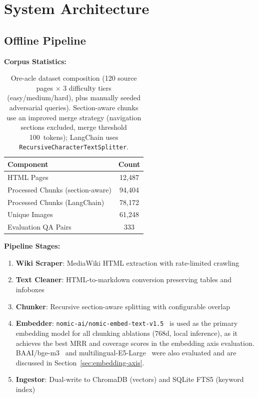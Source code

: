 \documentclass[11pt,a4paper]{article}
\begin{document}
\section{System Architecture}

\subsection{Offline Pipeline}

\textbf{Corpus Statistics:}
\begin{table}[h]
\caption{Ore-acle dataset composition (120 source pages $\times$ 3 difficulty tiers (easy/medium/hard), plus manually seeded adversarial queries). Section-aware chunks use an improved merge strategy (navigation sections excluded, merge threshold 100~tokens); LangChain uses \texttt{RecursiveCharacterTextSplitter}.}
\centering
\begin{tabular}{lc}
\toprule
\textbf{Component} & \textbf{Count} \\
\midrule
HTML Pages & 12,487 \\
Processed Chunks (section-aware) & 94,404 \\
Processed Chunks (LangChain) & 78,172 \\
Unique Images & 61,248 \\
Evaluation QA Pairs & 333 \\
\bottomrule
\end{tabular}
\label{tab:corpus}
\end{table}

\textbf{Pipeline Stages:}
\begin{enumerate}
    \item \textbf{Wiki Scraper}: MediaWiki HTML extraction with rate-limited crawling
    \item \textbf{Text Cleaner}: HTML-to-markdown conversion preserving tables and infoboxes
    \item \textbf{Chunker}: Recursive section-aware splitting with configurable overlap
    \item \textbf{Embedder}: \texttt{nomic-ai/nomic-embed-text-v1.5}~\cite{nomic2024} is used as the primary embedding model for all chunking ablations (768d, local inference), as it achieves the best MRR and coverage scores in the embedding axis evaluation. BAAI/bge-m3~\cite{bge2024} and multilingual-E5-Large~\cite{wang2022text} were also evaluated and are discussed in Section~\ref{sec:embedding-axis}.
    \item \textbf{Ingestor}: Dual-write to ChromaDB (vectors) and SQLite FTS5 (keyword index)
\end{enumerate}
\end{document}
